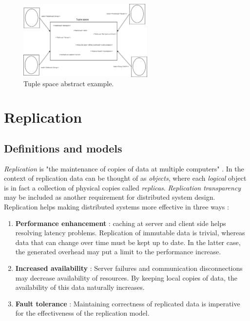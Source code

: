 \begin{figure}[h]
	\begin{center}
		\includegraphics[width=0.6\textwidth]{img/systems-and-architectures/tuplespace}
	\end{center}
	\caption{Tuple space abstract example.}
	\label{fig:tuplespace}
\end{figure}




\section{Replication}

\subsection{Definitions and models}

\emph{Replication} is "the maintenance of copies of data at multiple computers" \cite{Coulouris:2011:DSC:2029110}. In the context of replication data can be thought of as \emph{objects}, where each \emph{logical} object is in fact a collection of physical copies called \emph{replicas}. \emph{Replication transparency} may be included as another requirement for distributed system design. Replication helps making distributed systems more effective in three ways \cite{Coulouris:2011:DSC:2029110}:
\begin{enumerate}
	\item \textbf{Performance enhancement} : caching at server and client side helps resolving latency problems. Replication of immutable data is trivial, whereas data that can change over time must be kept up to date. In the latter case, the generated overhead may put a limit to the performance increase.
	\item \textbf{Increased availability} : Server failures and communication disconnections may decrease availability of resources. By keeping local copies of data, the availability of this data naturally increases.
	\item \textbf{Fault tolerance} : Maintaining correctness of replicated data is imperative for the effectiveness of the replication model.
\end{enumerate}

